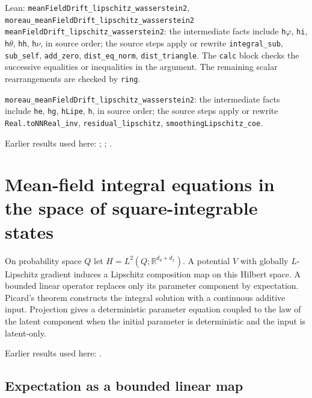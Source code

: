 \documentclass[11pt,a4paper]{report}
\begin{document}
\begin{leanbox}{Lean: \texttt{meanFieldDrift\_\allowbreak{}lipschitz\_\allowbreak{}wasserstein2}, \texttt{moreau\_\allowbreak{}meanFieldDrift\_\allowbreak{}lipschitz\_\allowbreak{}wasserstein2}}
\texttt{mean\allowbreak{}Field\allowbreak{}Drift\_\allowbreak{}lipschitz\_\allowbreak{}wasserstein2}: the intermediate facts include \texttt{h\ensuremath{\varphi}}, \texttt{hi}, \texttt{h\ensuremath{\theta}}, \texttt{hh}, \texttt{h\ensuremath{\nu}}, in source order; the source steps apply or rewrite \texttt{integral\_\allowbreak{}sub}, \texttt{sub\_\allowbreak{}self}, \texttt{add\_\allowbreak{}zero}, \texttt{dist\_\allowbreak{}eq\_\allowbreak{}norm}, \texttt{dist\_\allowbreak{}triangle}. The \texttt{calc} block checks the successive equalities or inequalities in the argument. The remaining scalar rearrangements are checked by \texttt{ring}.



\texttt{moreau\_\allowbreak{}mean\allowbreak{}Field\allowbreak{}Drift\_\allowbreak{}lipschitz\_\allowbreak{}wasserstein2}: the intermediate facts include \texttt{he}, \texttt{hg}, \texttt{h\allowbreak{}Lipe}, \texttt{h}, in source order; the source steps apply or rewrite \texttt{Real.\allowbreak{}to\allowbreak{}NNReal\_\allowbreak{}inv}, \texttt{residual\_\allowbreak{}lipschitz}, \texttt{smoothing\allowbreak{}Lipschitz\_\allowbreak{}coe}.
\end{leanbox}


Earlier results used here: \cite[Section~3.17.4]{LangevinLean2026ULASC}; \cite[Section~3.1.1]{LangevinLean2026IPLA}; \cite[Section~3.11.1]{LangevinLean2026IPLA}.
\section{\texorpdfstring{Mean-field integral equations in the space of square-integrable states}{Mean-field integral equations in the space of square-integrable states}}
\label{proof-module-ProximalLangevin-MeanFieldProcess-lean}


On probability space \(Q\) let \(H=L^2(Q;\mathbb R^{d_\theta+d_x})\). A potential \(V\) with globally \(L\)-Lipschitz gradient induces a Lipschitz composition map on this Hilbert space. A bounded linear operator replaces only its parameter component by expectation. Picard’s theorem constructs the integral solution with a continuous additive input. Projection gives a deterministic parameter equation coupled to the law of the latent component when the initial parameter is deterministic and the input is latent-only.



Earlier results used here: \cite[Section~3.25]{LangevinLean2026ULASC}.
\subsection{\texorpdfstring{Expectation as a bounded linear map}{Expectation as a bounded linear map}}
\label{report-step-ProximalLangevin-MeanFieldProcess-lean-1}
\end{document}
